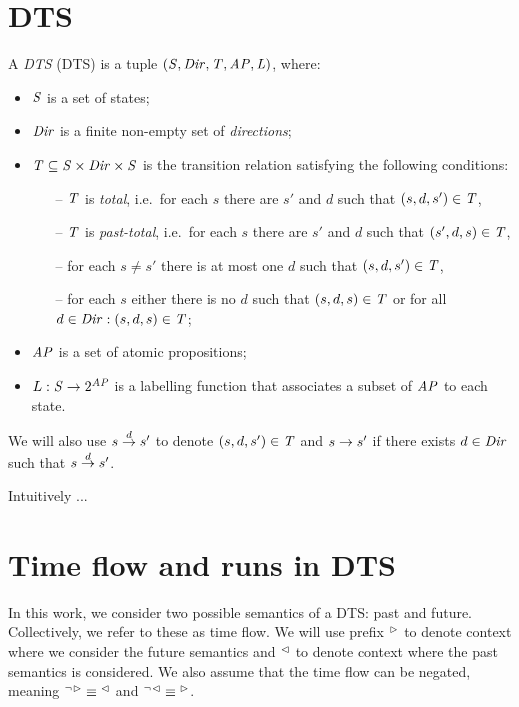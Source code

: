 \section{\Acl{DTS}}

A \emph{\acl{DTS}} (\acs{DTS}) is a tuple $(\mathit{S}, \mathit{Dir}, \mathit{T}, \mathit{AP}, \mathit{L})$, where:

\begin{itemize}
	\item $\mathit{S}$ is a set of states;
	\item $\mathit{Dir}$ is a finite non-empty set of \emph{directions};
	\item $\mathit{T} \subseteq \mathit{S} \times \mathit{Dir} \times \mathit{S}$ is the transition relation satisfying the following conditions:
	\begin{itemize}
		\item[--] $\mathit{T}$ is \emph{total}, i.e.~for each $s$ there are $s'$ and $d$ such that $(s, d,
		s')\in \mathit{T}$,
		\item[--] $\mathit{T}$ is \emph{past-total}, i.e.~for each $s$ there are $s'$ and $d$ such that
		$(s', d, s)\in \mathit{T}$,
		\item[--] for each $s \ne s'$ there is at most one $d$ such that $(s, d, s')\in \mathit{T}$,
		\item[--] for each $s$ either there is no $d$ such that $(s,d,s) \in \mathit{T}$ or
		for all $d \in \mathit{Dir}: (s,d,s) \in \mathit{T}$;
	\end{itemize}
	\item $\mathit{AP}$ is a set of atomic propositions;
	\item $L : \mathit{S} \rightarrow 2^{\mathit{AP}}$ is a labelling function that associates a subset of $\mathit{AP}$ to each state.
\end{itemize}

We will also use $s \stackrel{d}{\rightarrow} s'$ to denote $(s, d, s') \in \mathit{T}$ and $s \rightarrow s'$ if there exists $d \in \mathit{Dir}$ such that $s \stackrel{d}{\rightarrow} s'$.

Intuitively ...

\section{Time flow and runs in \ac{DTS}}

In this work, we consider two possible semantics of a \ac{DTS}: past and future. Collectively, we refer to these as time flow. We will use prefix ${}^\vartriangleright$ to denote context where we consider the future semantics and ${}^\vartriangleleft$ to denote context where the past semantics is considered. We also assume that the time flow can be negated, meaning ${}^{\neg}{}^\vartriangleright \equiv {}^\vartriangleleft$ and ${}^{\neg}{}^\vartriangleleft \equiv {}^\vartriangleright$.

